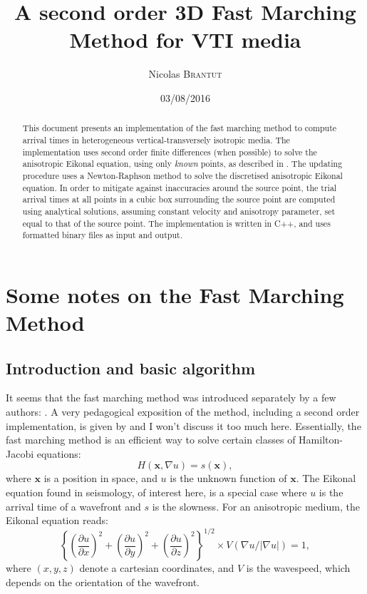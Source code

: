 \documentclass{article}
\title{A second order 3D Fast Marching Method for VTI media}
\author{Nicolas \textsc{Brantut}}
\date{03/08/2016}
\renewcommand\vec[1]{\mathbf{#1}}
\begin{document}
\maketitle

\begin{abstract}
This document presents an implementation of the fast marching method to compute arrival times in heterogeneous vertical-transversely isotropic media. The implementation uses second order finite differences (when possible) to solve the anisotropic Eikonal equation, using only \emph{known} points, as described in \citet{sethian99}. The updating procedure uses a Newton-Raphson method to solve the discretised anisotropic Eikonal equation. In order to mitigate against inaccuracies around the source point, the trial arrival times at all points in a cubic box surrounding the source point are computed using analytical solutions, assuming constant velocity and anisotropy parameter, set equal to that of the source point. The implementation is written in C++, and uses formatted binary files as input and output.
\end{abstract}

\section{Some notes on the Fast Marching Method}

\subsection{Introduction and basic algorithm}

It seems that the fast marching method was introduced separately by a few authors: \citet{tsitsiklis95,sethian96,helmsen96}. A very pedagogical exposition of the method, including a second order implementation, is given by \citet{sethian99} and I won't discuss it too much here. Essentially, the fast marching method is an efficient way to solve certain classes of Hamilton-Jacobi equations:
\begin{equation} \label{eq:HJ}
  H(\vec{x},\nabla u) = s(\vec{x}),
\end{equation}
where $\vec{x}$ is a position in space, and $u$ is the unknown function of $\vec{x}$. The Eikonal equation found in seismology, of interest here, is a special case where $u$ is the arrival time of a wavefront and $s$ is the slowness. For an anisotropic medium, the Eikonal equation reads:
\begin{equation} \label{eq:eikonal}
  \left\{\left(\frac{\partial u}{\partial x}\right)^2 + \left(\frac{\partial u}{\partial y}\right)^2 + \left(\frac{\partial u}{\partial z}\right)^2  \right\}^{1/2} \times V(\nabla u /|\nabla u|)= 1,
\end{equation}
where $(x,y,z)$ denote a cartesian coordinates, and $V$ is the wavespeed, which depends on the orientation of the wavefront.
\end{document}
